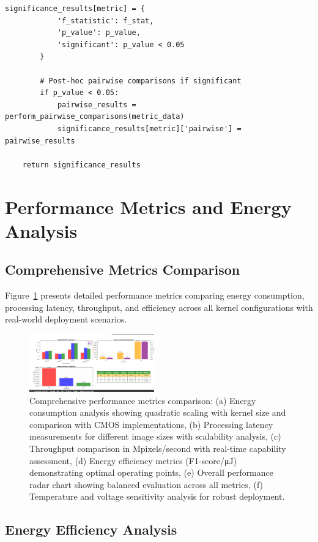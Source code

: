 \documentclass[conference]{IEEEtran}
\begin{document}
{{{{\begin{lstlisting}[caption={Performance optimization implementation}]
        significance_results[metric] = {
            'f_statistic': f_stat,
            'p_value': p_value,
            'significant': p_value < 0.05
        }
        
        # Post-hoc pairwise comparisons if significant
        if p_value < 0.05:
            pairwise_results = perform_pairwise_comparisons(metric_data)
            significance_results[metric]['pairwise'] = pairwise_results
    
    return significance_results
\end{lstlisting}

\section{Performance Metrics and Energy Analysis}

\subsection{Comprehensive Metrics Comparison}

Figure~\ref{fig:metrics_comparison} presents detailed performance metrics comparing energy consumption, processing latency, throughput, and efficiency across all kernel configurations with real-world deployment scenarios.

\begin{figure}[htbp]
\centerline{\includegraphics[width=0.48\textwidth]{Screenshot 2025-07-12 123917.png}}
\caption{Comprehensive performance metrics comparison: (a) Energy consumption analysis showing quadratic scaling with kernel size and comparison with CMOS implementations, (b) Processing latency measurements for different image sizes with scalability analysis, (c) Throughput comparison in Mpixels/second with real-time capability assessment, (d) Energy efficiency metrics (F1-score/μJ) demonstrating optimal operating points, (e) Overall performance radar chart showing balanced evaluation across all metrics, (f) Temperature and voltage sensitivity analysis for robust deployment.}
\label{fig:metrics_comparison}
\end{figure}

\subsection{Energy Efficiency Analysis}

}}}}
\end{document}
